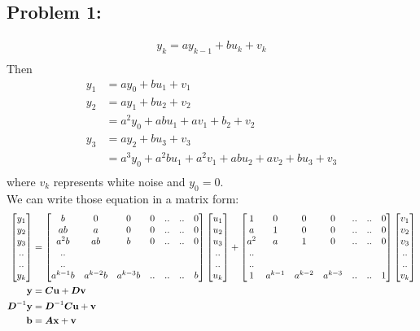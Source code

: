 \documentclass{article}
\begin{document}
 


\subsection*{{Problem 1: }}
\begin{align*} 
y_k=ay_{k-1} + bu_k + v_k\\
\end{align*}
Then \begin{align*}
y_1 &= ay_0 + bu_1 +v_1 \\
y_2 &= ay_1 + bu_2 +v_2 \\
&= a^2y_0+abu_1+av_1+b_2+v_2 \\
y_3 & = ay_2+ bu_3 + v_3 \\
& = a^3y_0 + a^2bu_1 +a^2v_1 + abu_2 +av_2 +bu_3 +v_3 \\
\end{align*}
where $v_k$ represents white noise and $y_0=0$. \\
We can write those equation in a matrix form: \\
\begin{align*} 
\begin{bmatrix} y_1 \\ y_2 \\ y_3 \\ ..\\ ..\\y_k \end{bmatrix} &= \begin{bmatrix} b& 0& 0& 0& ..& ..& 0 \\ab& a& 0& 0& ..& ..& 0 \\a^2 b& ab& b& 0& ..& ..& 0\\ .. \\ .. \\ a^{k-1}b& a^{k-2}b& a^{k-3}b& ..& ..& ..& b   \end{bmatrix}
	\begin{bmatrix} u_1 \\ u_2 \\ u_3 \\ ..\\ ..\\u_k \end{bmatrix}
	+\begin{bmatrix} 1& 0& 0& 0& ..& ..& 0 \\a& 1& 0& 0& ..& ..& 0 \\a^2& a& 1& 0& ..& ..& 0 \\ .. \\ .. \\ 1& a^{k-1}& a^{k-2} & a^{k-3} & ..& ..& 1  \end{bmatrix}
	\begin{bmatrix} v_1 \\ v_2 \\ v_3 \\ ..\\ ..\\v_k \end{bmatrix}\\
\boldsymbol{\mathrm{y}} &= \boldsymbol{C}\boldsymbol{\mathrm{u}} + \boldsymbol{D}\boldsymbol{\mathrm{v}} \\
\boldsymbol{D}^{-1}\boldsymbol{\mathrm{y}} & = \boldsymbol{D}^{-1}\boldsymbol{C}\boldsymbol{\mathrm{u}} + \boldsymbol{\mathrm{v}} \\
\boldsymbol{\mathrm{b}} &= \boldsymbol{A}\boldsymbol{\mathrm{x}} + \boldsymbol{\mathrm{v}} \\
\end{align*}
\end{document}

